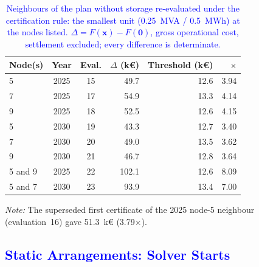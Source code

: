 \documentclass[preprint,12pt]{elsarticle}
\begin{document}
\begin{table}[htbp!]
    \centering
    \caption{\textcolor{blue}{Neighbours of the plan without storage re-evaluated under the certification rule: the smallest unit (0.25~MVA / 0.5~MWh) at the nodes listed. $\Delta = F(\boldsymbol{x}) - F(\boldsymbol{0})$, gross operational cost, settlement excluded; every difference is determinate.}}
    \label{tab:appE_neighbours}
    \scriptsize\setlength{\tabcolsep}{5pt}
    \begin{tabular}{l c c r r r}
        \toprule
        Node(s) & Year & Eval. & $\Delta$ (k\euro) & Threshold (k\euro) & $\times$ \\
        \midrule
        5 & 2025 & 15 & 49.7 & 12.6 & 3.94 \\
        7 & 2025 & 17 & 54.9 & 13.3 & 4.14 \\
        9 & 2025 & 18 & 52.5 & 12.6 & 4.15 \\
        5 & 2030 & 19 & 43.3 & 12.7 & 3.40 \\
        7 & 2030 & 20 & 49.0 & 13.5 & 3.62 \\
        9 & 2030 & 21 & 46.7 & 12.8 & 3.64 \\
        5 and 9 & 2025 & 22 & 102.1 & 12.6 & 8.09 \\
        5 and 7 & 2030 & 23 & 93.9 & 13.4 & 7.00 \\
        \bottomrule
    \end{tabular}
    \par\smallskip
    \begin{minipage}{0.80\linewidth}
        \scriptsize\raggedright
        \textit{Note:} The superseded first certificate of the 2025 node-5 neighbour (evaluation~16) gave 51.3~k\euro{} (3.79$\times$).
    \end{minipage}
\end{table}

\subsection{\textcolor{blue}{Static Arrangements: Solver Starts}}
\label{app:results_benchmark}
\end{document}
